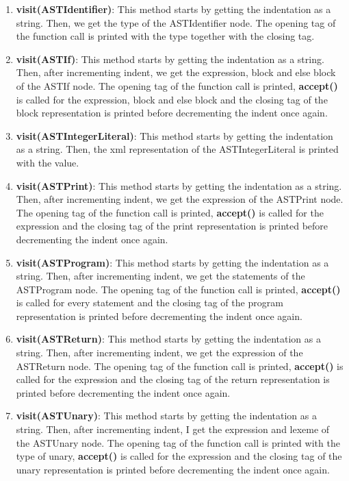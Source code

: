 \documentclass{article}
\begin{document}
\begin{enumerate}
					\item \textbf{visit(ASTIdentifier)}: This method starts by getting the indentation as a string. Then, we get the type of the ASTIdentifier node. The opening tag of the function call is printed with the type together with the closing tag.	
					
							\item \textbf{visit(ASTIf)}: This method starts by getting the indentation as a string. Then, after incrementing indent, we get the expression, block and else block of the ASTIf node. The opening tag of the function call is printed, \textbf{accept()} is called for the expression, block and else block and the closing tag of the block representation is printed before decrementing the indent once again.	
							
					\item \textbf{visit(ASTIntegerLiteral)}: This method starts by getting the indentation as a string. Then, the xml representation of the ASTIntegerLiteral is printed with the value.
					
					\item \textbf{visit(ASTPrint)}: This method starts by getting the indentation as a string. Then, after incrementing indent, we get the expression of the ASTPrint node. The opening tag of the function call is printed, \textbf{accept()} is called for the expression and the closing tag of the print representation is printed before decrementing the indent once again.
					
					\item \textbf{visit(ASTProgram)}: This method starts by getting the indentation as a string. Then, after incrementing indent, we get the statements of the ASTProgram node. The opening tag of the function call is printed, \textbf{accept()} is called for every statement and the closing tag of the program representation is printed before decrementing the indent once again.		
					
					\item \textbf{visit(ASTReturn)}: This method starts by getting the indentation as a string. Then, after incrementing indent, we get the expression of the ASTReturn node. The opening tag of the function call is printed, \textbf{accept()} is called for the expression and the closing tag of the return representation is printed before decrementing the indent once again.
			
					\item \textbf{visit(ASTUnary)}: This method starts by getting the indentation as a string. Then, after incrementing indent, I get the expression and lexeme of the ASTUnary node. The opening tag of the function call is printed with the type of unary, \textbf{accept()} is called for the expression and the closing tag of the unary representation is printed before decrementing the indent once again.
	

\end{enumerate}
\end{document}
